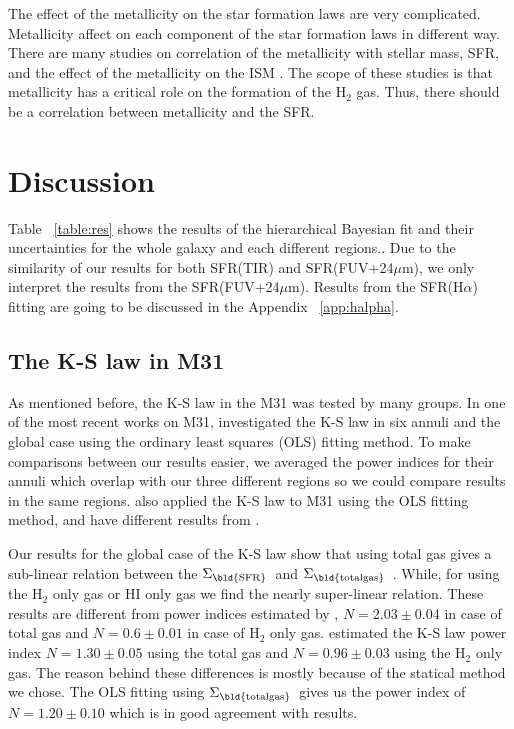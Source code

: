 \documentclass[useAMS,usenatbib]{mn2e}
\newcommand \sigmatotalgas {$\Sigma_{\rm \bld {total gas }} $\ }
\newcommand \sigmasfr     {$\Sigma_{\rm \bld {SFR }} $\ }
\begin{document}
The effect of the metallicity on the star formation laws are very complicated.  Metallicity affect on each component of the star formation laws in different way. There are many studies on correlation of the metallicity with stellar mass, SFR, and the effect of the metallicity on the ISM \citep[e.g.,][]{Boissier03, Leroy08, Krumholz09, Mannucci10, Dib11, Lilly13}. The scope of these studies is that metallicity has a critical role on the formation of the H$_2$ gas. Thus, there should be a correlation between metallicity and the SFR.

%
\section{Discussion}

Table ~\ref{table:res} shows the results of the hierarchical Bayesian fit and their uncertainties for the whole galaxy and each different regions.. Due to the similarity of our results for both SFR(TIR) and SFR(FUV+24$\mu$m), we only interpret the results from the SFR(FUV+24$\mu$m). Results from the SFR(H$\alpha$) fitting are going to be discussed in the Appendix ~\ref{app:halpha}.

\subsection{The K-S law in M31}

As mentioned before, the K-S law in the M31 was tested by many groups. In one of the most recent works on M31, \cite{Ford13} investigated the K-S law in six annuli and the global case using the ordinary least squares (OLS) fitting method. To make comparisons between our results easier, we averaged the power indices for their annuli which overlap with our three different regions so we could compare results in the same regions.
\cite{Tabatabaei10} also applied the K-S law to M31 using the OLS fitting method, and have different results from \cite{Ford13}.

Our results for the global case of the K-S law show that using total gas gives a sub-linear relation between the \sigmasfr and \sigmatotalgas. While, for using the H$_{2}$ only gas or HI only gas we find the nearly super-linear relation. These results are different from power indices estimated by \cite{Ford13}, $N=2.03\pm0.04$ in case of total gas and $N=0.6\pm0.01$ in case of H$_{2}$ only gas. \cite{Tabatabaei10} estimated the K-S law power index $N=1.30\pm0.05$ using the total gas and $N=0.96\pm0.03$ using the H$_{2}$ only gas. The reason behind these differences is mostly because of the statical method we chose. The OLS fitting using \sigmatotalgas gives us the power index of $N=1.20\pm0.10$ which is in good agreement with \cite{Tabatabaei10} results.
\end{document}
